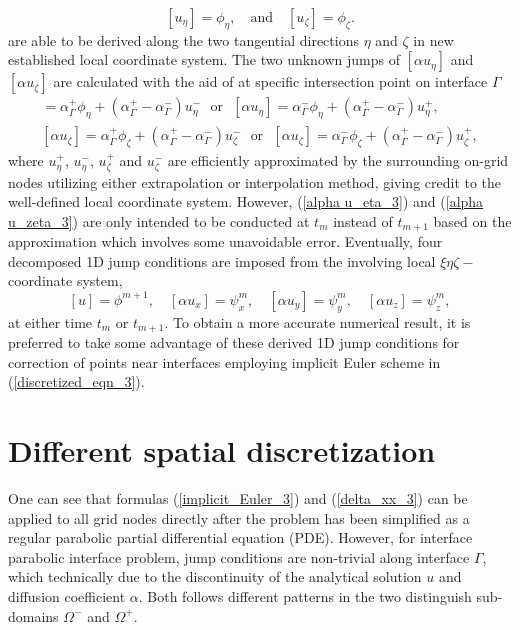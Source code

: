 \documentclass[dissertation]{uathesis}
\begin{document}
\begin{body}
%
\begin{equation}\label{jump_tan_3}
[u_{\eta}] = \phi_{\eta}, \quad \mbox{and} \quad [u_{\zeta}] = \phi_{\zeta}.
\end{equation}
%
are able to be derived along the two tangential directions $\eta$ and $\zeta$ in new established local coordinate system. The two unknown jumps of $[\alpha u_{\eta}]$ and $[\alpha u_{\zeta}]$ are calculated with the aid of at specific intersection point on interface $\Gamma$
%
\begin{align}
[\alpha u_{\eta}] = \alpha^{+}_{\Gamma}\phi_{\eta} + (\alpha_{\Gamma}^{+}-\alpha_{\Gamma}^{-})u^{-}_{\eta} ~~~ \mbox{or} ~~~ 
[\alpha u_{\eta}]  = \alpha_{\Gamma}^{-}\phi_{\eta} + 
(\alpha_{\Gamma}^{+}-\alpha_{\Gamma}^{-}) u^{+}_{\eta}, \label{alpha u_eta_3}    \\
[\alpha u_{\zeta}] = \alpha_{\Gamma}^{+}\phi_{\zeta} +
(\alpha_{\Gamma}^{+}-\alpha_{\Gamma}^{-}) u^{-}_{\zeta} ~~~ \mbox{or} ~~~ 
[\alpha u_{\zeta}] = \alpha_{\Gamma}^{-}\phi_{\zeta} + 
(\alpha_{\Gamma}^{+}-\alpha_{\Gamma}^{-}) u^{+}_{\zeta}, \label{alpha u_zeta_3}
\end{align}
%
where $u^{+}_{\eta}$, $u^{-}_{\eta}$, $u^{+}_{\zeta}$ and $u^{-}_{\zeta}$ are efficiently approximated by the surrounding on-grid nodes utilizing either extrapolation or interpolation method, giving credit to the well-defined local coordinate system. However, (\ref{alpha u_eta_3}) and (\ref{alpha u_zeta_3}) are only intended to be conducted at $t_m$ instead of $t_{m+1}$ based on the approximation which involves some unavoidable error. Eventually, four decomposed 1D jump conditions are imposed from the involving local $\xi\eta\zeta-$coordinate system, 
%
\begin{equation}\label{jump1D_3}
[u]=\phi^{m+1}, \quad [\alpha u_x]=\psi_x^m, \quad [\alpha u_y]=\psi_y^m, \quad [\alpha u_z]=\psi_z^m, 
\end{equation}
%
at either time $t_m$ or $t_{m+1}$. To obtain a more accurate numerical result, it is preferred to take some advantage of these derived 1D jump conditions for correction of points near interfaces employing implicit Euler scheme in (\ref{discretized_eqn_3}). 

\section{Different spatial discretization}
One can see that formulas (\ref{implicit_Euler_3}) and (\ref{delta_xx_3}) can be applied to all grid nodes directly after the problem has been simplified as a regular parabolic partial differential equation (PDE). However, for interface parabolic interface problem, jump conditions are non-trivial along interface $\Gamma$, which technically due to the discontinuity of the analytical solution $u$ and diffusion coefficient $\alpha$. Both follows different patterns in the two distinguish sub-domains $\Omega^{-}$ and $\Omega^{+}$.


\end{body}
\end{document}
